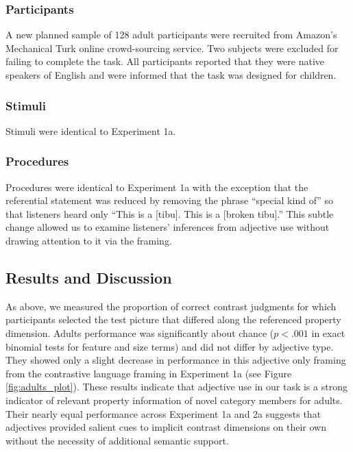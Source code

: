 \documentclass[10pt,letterpaper]{article}
\begin{document}
\subsubsection{Participants}

A new planned sample of 128 adult participants were recruited from Amazon's Mechanical Turk online crowd-sourcing service.  Two subjects were excluded for failing to complete the task. All participants reported that they were native speakers of English and were informed that the task was designed for children.  

\subsubsection{Stimuli}

Stimuli were identical to Experiment 1a. 

\subsubsection{Procedures}

Procedures were identical to Experiment 1a with the exception that the referential statement was reduced by removing the phrase ``special kind of'' so that listeners heard only ``This is a [tibu]. This is a [broken tibu].''   This subtle change allowed us to examine listeners' inferences from adjective use without drawing attention to it via the framing.  

\subsection{Results and Discussion}

As above, we measured the proportion of correct contrast judgments for which participants selected the test picture that differed along the referenced property dimension.  Adults performance was significantly about chance ($p < .001$ in exact binomial tests for feature and size terms) and did not differ by adjective type.  They showed only a slight decrease in performance in this adjective only framing from the contrastive language framing in Experiment 1a (see Figure \ref{fig:adults_plot}).  These results indicate that adjective use in our task is a strong indicator of relevant property information of novel category members for adults.  Their nearly equal performance across Experiment 1a and 2a suggests that adjectives provided salient cues to implicit contrast dimensions on their own without the necessity of additional semantic support. 
\end{document}
